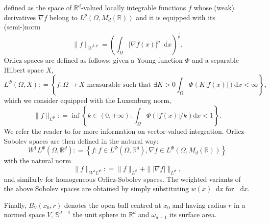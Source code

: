 \documentclass[11pt, a4paper]{amsart}
\theoremstyle{definition}
\theoremstyle{remark}
\newcommand{\R}{\mathbb{R}}
\newcommand*\diff{\mathop{}\!\mathrm{d}}
\begin{document}
defined as the space of $\R^d$-valued locally integrable
functions $f$
whose (weak) derivatives $\nabla f$ belong to
$L^p(\Omega, M_d(\mathbb{R}))$ and it is equipped with its (semi-)norm
\begin{equation*}
\|f\|_{\dot{W}^{1,p}}=
\left(\int_{\Omega}|\nabla f(x)|^p\diff x\right)
^{\frac 1p}.
\end{equation*}
Orlicz spaces are defined as follows:
given a Young function
$\Phi$ and a separable Hilbert space $X$, 
\begin{equation*}
L^\Phi(\Omega, X)
\mathrel{:}=
\left\{f\colon\Omega\to X\text{ measurable such that }
\exists K>0
\int_\Omega \Phi(K|f(x)|)\mathrm{d}x<\infty\right\},
\end{equation*}
which we consider equipped with the Luxemburg norm,
\begin{equation*}
\|f\|_{L^\Phi}\mathrel{:}=
\inf\left\{k \in (0,+\infty)\colon
\int_\Omega \Phi(|f(x)|/k)\mathrm{d}x<1 \right\}.
\end{equation*}
We refer the reader to \cite{analysisBS}
for more information on vector-valued
integration.
Orlicz-Sobolev spaces
are then defined in the natural way:
\begin{equation*}
W^1L^\Phi(\Omega, \R^d)
\mathrel{:}=
\left\{f\colon f\in L^\Phi(\Omega, \R^d),
\nabla f\in L^\Phi(\Omega, M_d(\R))\right\}
\end{equation*}
with the natural norm
\begin{equation*}
\|f\|_{W^1L^\Phi}\mathrel{:}=\|f\|_{L^\Phi}+
\| |\nabla f|\|_{L^\Phi},
\end{equation*} 
and similarly for homogeneous Orlicz-Sobolev spaces.
The weighted variants of the above Sobolev spaces are
obtained by simply substituting
$w(x)\diff x$ for $\diff x$.\par
Finally, $B_V(x_0,r)$ denotes the open ball 
centred at $x_0$ and having radius $r$ in a normed 
space $V$, $\mathbb S^{d-1}$
the unit sphere in $\R^d$ and $\omega_{d-1}$
its surface area.
\end{document}
